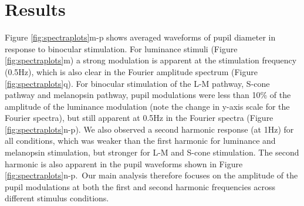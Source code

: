 \documentclass[
]{article}
\begin{document}
\section{Results}\label{results}

Figure \ref{fig:spectraplots}m-p shows averaged waveforms of pupil diameter in response to binocular stimulation. For luminance stimuli (Figure \ref{fig:spectraplots}m) a strong modulation is apparent at the stimulation frequency (0.5Hz), which is also clear in the Fourier amplitude spectrum (Figure \ref{fig:spectraplots}q). For binocular stimulation of the L-M pathway, S-cone pathway and melanopsin pathway, pupil modulations were less than 10\% of the amplitude of the luminance modulation (note the change in y-axis scale for the Fourier spectra), but still apparent at 0.5Hz in the Fourier spectra (Figure \ref{fig:spectraplots}n-p). We also observed a second harmonic response (at 1Hz) for all conditions, which was weaker than the first harmonic for luminance and melanopsin stimulation, but stronger for L-M and S-cone stimulation. The second harmonic is also apparent in the pupil waveforms shown in Figure \ref{fig:spectraplots}n-p.~Our main analysis therefore focuses on the amplitude of the pupil modulations at both the first and second harmonic frequencies across different stimulus conditions.
\end{document}
